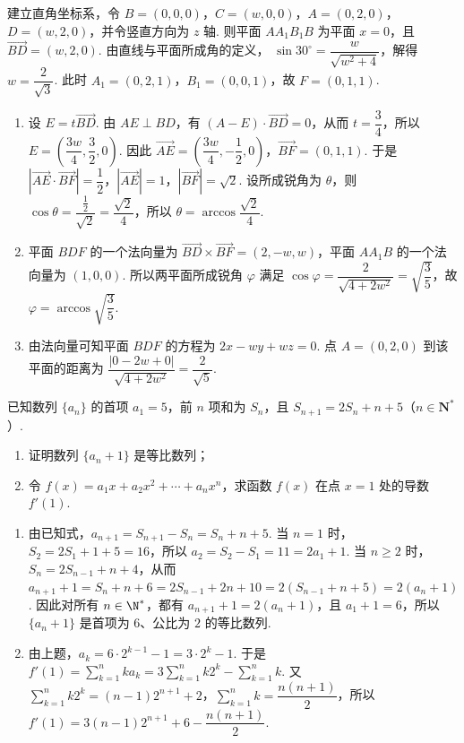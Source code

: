 \begin{solution}
建立直角坐标系，令 \(B=(0,0,0)\)，\(C=(w,0,0)\)，\(A=(0,2,0)\)，\(D=(w,2,0)\)，并令竖直方向为 \(z\) 轴. 则平面 \(AA_1B_1B\) 为平面 \(x=0\)，且 \(\overrightarrow{BD}=(w,2,0)\). 由直线与平面所成角的定义，
\(\sin30^{\circ}=\dfrac{w}{\sqrt{w^2+4}}\)，解得 \(w=\dfrac2{\sqrt3}\). 此时 \(A_1=(0,2,1)\)，\(B_1=(0,0,1)\)，故 \(F=(0,1,1)\).

\begin{enumerate}
\item 设 \(E=t\overrightarrow{BD}\). 由 \(AE\perp BD\)，有 \((A-E)\cdot\overrightarrow{BD}=0\)，从而 \(t=\dfrac34\)，所以 \(E=\left(\dfrac{3w}{4},\dfrac32,0\right)\). 因此 \(\overrightarrow{AE}=\left(\dfrac{3w}{4},-\dfrac12,0\right)\)，\(\overrightarrow{BF}=(0,1,1)\). 于是
\(\left|\overrightarrow{AE}\cdot\overrightarrow{BF}\right|=\dfrac12\)，\(\left|\overrightarrow{AE}\right|=1\)，\(\left|\overrightarrow{BF}\right|=\sqrt2\). 设所成锐角为 \(\theta\)，则 \(\cos\theta=\dfrac{\frac{1}{2}}{\sqrt2}=\dfrac{\sqrt2}{4}\)，所以 \(\theta=\arccos\dfrac{\sqrt2}{4}\).
\item 平面 \(BDF\) 的一个法向量为
\(\overrightarrow{BD}\times\overrightarrow{BF}=(2,-w,w)\)，平面 \(AA_1B\) 的一个法向量为 \((1,0,0)\). 所以两平面所成锐角 \(\varphi\) 满足 \(\cos\varphi=\dfrac2{\sqrt{4+2w^2}}=\sqrt{\dfrac35}\)，故 \(\varphi=\arccos\sqrt{\dfrac35}\).
\item 由法向量可知平面 \(BDF\) 的方程为 \(2x-wy+wz=0\). 点 \(A=(0,2,0)\) 到该平面的距离为
\(\dfrac{|0-2w+0|}{\sqrt{4+2w^2}}=\dfrac2{\sqrt5}\).
\end{enumerate}
\end{solution}

\begin{problem}
已知数列 \(\{a_{n}\}\) 的首项 \(a_1 = 5\)，前 \(n\) 项和为 \(S_{n}\)，且 \(S_{n+1} = 2S_{n} + n + 5\)（\(n \in \mathbf{N}^{*}\)）.

\begin{enumerate}
\item 证明数列 \(\{a_{n} + 1\}\) 是等比数列；
\item 令 \( f(x) = a_1x + a_2x^2 + \cdots + a_nx^n \)，求函数 \( f(x) \) 在点 \( x = 1 \) 处的导数 \( f'(1) \).
\end{enumerate}
\end{problem}

\begin{solution}
\begin{enumerate}
\item 由已知式，\(a_{n+1}=S_{n+1}-S_n=S_n+n+5\). 当 \(n=1\) 时，\(S_2=2S_1+1+5=16\)，所以 \(a_2=S_2-S_1=11=2a_1+1\). 当 \(n\geqslant2\) 时，\(S_n=2S_{n-1}+n+4\)，从而
\(a_{n+1}+1=S_n+n+6=2S_{n-1}+2n+10=2\left(S_{n-1}+n+5\right)=2(a_n+1)\).
因此对所有 \(n\in\N^*\)，都有 \(a_{n+1}+1=2(a_n+1)\)，且 \(a_1+1=6\)，所以 \(\{a_n+1\}\) 是首项为 \(6\)、公比为 \(2\) 的等比数列.
\item 由上题，\(a_k=6\cdot2^{k-1}-1=3\cdot2^k-1\). 于是
\(f'(1)=\sum_{k=1}^nka_k=3\sum_{k=1}^nk2^k-\sum_{k=1}^nk\). 又 \(\sum_{k=1}^nk2^k=(n-1)2^{n+1}+2\)，\(\sum_{k=1}^nk=\dfrac{n(n+1)}2\)，所以
\(f'(1)=3(n-1)2^{n+1}+6-\dfrac{n(n+1)}2\).
\end{enumerate}
\end{solution}

